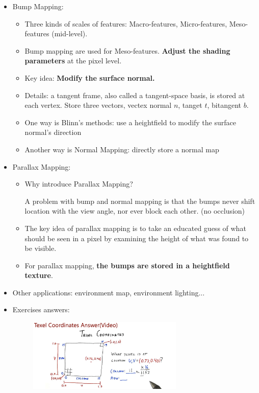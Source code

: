 \documentclass{article}
\begin{document}
\begin{itemize}
\begin{itemize}
  \end{itemize} 
  
 \item Bump Mapping:
 \begin{itemize}
     \item Three kinds of scales of features: Macro-features, Micro-features, Meso-features (mid-level).
     \item Bump mapping are used for Meso-features. \textbf{Adjust the shading parameters }at the pixel level.
     \item Key idea: \textbf{Modify the surface normal.}
     \item Details: a tangent frame, also called a tangent-space basis, is stored at each vertex. Store three vectors, vectex normal $n$, tanget $t$, bitangent $b$.
     
     \item One way is Blinn's methods: use a heightfield to modify the surface normal's direction
     \item Another way is Normal Mapping: directly store a normal map
 \end{itemize}
 
 \item Parallax Mapping:
 \begin{itemize}
     \item Why introduce Parallax Mapping? 
     
     A problem with bump and normal mapping is that the bumps never shift location with the view angle, nor ever block each other. (no occlusion)
     
     \item The key idea of parallax mapping is to take an educated guess of what should be seen in a pixel by examining the height of what was found to be visible.
     
     \item For parallax mapping, \textbf{the bumps are stored in a heightfield texture}.
 \end{itemize}
 
 \item Other applications: environment map, environment lighting...
 \item Exercises answers:
 
 \begin{figure}[H]
    \centering
    \includegraphics[width=0.7\textwidth]{imgs/ex1.png}
\end{figure}


\end{itemize}
\end{document}
